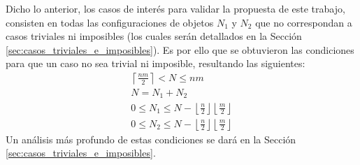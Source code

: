 Dicho lo anterior, los casos de interés para validar la propuesta de este trabajo, consisten en todas las configuraciones de objetos $N_1$ y $N_2$ que no correspondan a casos triviales ni imposibles (los cuales serán detallados en la Sección \ref{sec:casos_triviales_e_imposibles}).
Es por ello que se obtuvieron las condiciones para que un caso no sea trivial ni imposible, resultando las siguientes:
%
\begin{equation}
\label{eq:cond_casos_de_interes}
\begin{gathered}
	\left\lceil \frac{nm}{2} \right\rceil < N \leq nm \\[7pt]
	N = N_1 + N_2 \\[7pt]
	0 \leq N_1 \leq N - \left\lfloor \frac{n}{2} \right\rfloor \! \left\lfloor \frac{m}{2} \right\rfloor \\[7pt]
	0 \leq N_2 \leq N - \left\lfloor \frac{n}{2} \right\rfloor \! \left\lfloor \frac{m}{2} \right\rfloor
\end{gathered}
\end{equation}
%
Un análisis más profundo de estas condiciones se dará en la Sección \ref{sec:casos_triviales_e_imposibles}.
%
%
